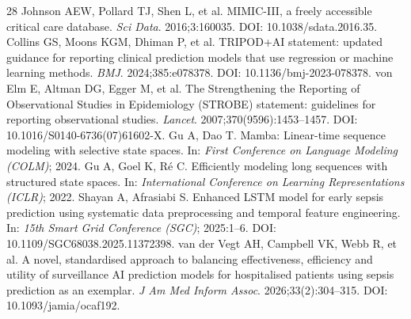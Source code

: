 \documentclass[12pt,a4paper]{article}
\begin{document}
\begin{singlespace}
\begin{thebibliography}{28}
 Johnson AEW, Pollard TJ, Shen L, et al. MIMIC-III, a freely accessible critical care database. \textit{Sci Data}. 2016;3:160035. DOI: 10.1038/sdata.2016.35.
 Collins GS, Moons KGM, Dhiman P, et al. TRIPOD+AI statement: updated guidance for reporting clinical prediction models that use regression or machine learning methods. \textit{BMJ}. 2024;385:e078378. DOI: 10.1136/bmj-2023-078378.
 von Elm E, Altman DG, Egger M, et al. The Strengthening the Reporting of Observational Studies in Epidemiology (STROBE) statement: guidelines for reporting observational studies. \textit{Lancet}. 2007;370(9596):1453--1457. DOI: 10.1016/S0140-6736(07)61602-X.
 Gu A, Dao T. Mamba: Linear-time sequence modeling with selective state spaces. In: \textit{First Conference on Language Modeling (COLM)}; 2024.
 Gu A, Goel K, Ré C. Efficiently modeling long sequences with structured state spaces. In: \textit{International Conference on Learning Representations (ICLR)}; 2022.
 Shayan A, Afrasiabi S. Enhanced LSTM model for early sepsis prediction using systematic data preprocessing and temporal feature engineering. In: \textit{15th Smart Grid Conference (SGC)}; 2025:1--6. DOI: 10.1109/SGC68038.2025.11372398.
 van der Vegt AH, Campbell VK, Webb R, et al. A novel, standardised approach to balancing effectiveness, efficiency and utility of surveillance AI prediction models for hospitalised patients using sepsis prediction as an exemplar. \textit{J Am Med Inform Assoc}. 2026;33(2):304--315. DOI: 10.1093/jamia/ocaf192.
\end{thebibliography}



\end{singlespace}
\end{document}
